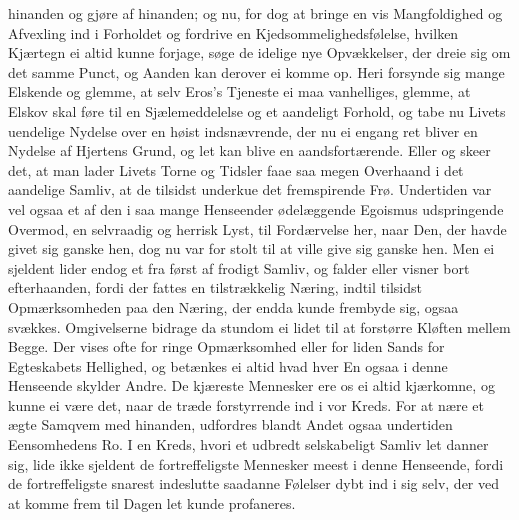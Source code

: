\documentclass[12pt,a4paper]{book}
\newcommand{\apage}[1]{\marginnote{\footnotesize\textit{[#1]}}}
\begin{document}
hinanden og gjøre af hinanden; og nu, \apage{100} for dog at bringe en vis
Mangfoldighed og Afvexling ind i Forholdet og fordrive en
Kjedsommelighedsfølelse, hvilken Kjærtegn ei altid kunne forjage, søge
de idelige nye Opvækkelser, der dreie sig om det samme Punct, og Aanden
kan derover ei komme op. Heri forsynde sig mange Elskende og glemme, at
selv Eros's Tjeneste ei maa vanhelliges, glemme, at Elskov skal føre til
en Sjælemeddelelse og et aandeligt Forhold, og tabe nu Livets uendelige
Nydelse over en høist indsnævrende, der nu ei engang ret bliver en
Nydelse af Hjertens Grund, og let kan blive en aandsfortærende. Eller og
skeer det, at man lader Livets Torne og Tidsler faae saa megen Overhaand
i det aandelige Samliv, at de tilsidst underkue det fremspirende Frø.
Undertiden var vel ogsaa et af den i saa mange Henseender ødelæggende
Egoismus udspringende Overmod, en selvraadig og herrisk Lyst, til
Fordærvelse her, naar Den, der havde givet sig ganske hen, dog nu var
for stolt til at ville give sig ganske hen. Men ei sjeldent lider endog
et fra først af frodigt Samliv, og falder eller visner bort
efterhaanden, fordi der fattes en tilstrækkelig Næring, indtil tilsidst
Opmærksomheden paa den Næring, der endda kunde frembyde sig, ogsaa
svækkes. Omgivelserne bidrage da stundom ei lidet til at forstørre
Kløften mellem Begge. Der vises ofte for ringe Opmærksomhed eller for
liden Sands for Egteskabets Hellighed, og betænkes ei altid hvad hver En
ogsaa i denne Henseende skylder Andre. De kjæreste Mennesker ere os ei
\apage{101} altid kjærkomne, og kunne ei være det, naar de træde forstyrrende ind i
vor Kreds. For at nære et ægte Samqvem med hinanden, udfordres blandt
Andet ogsaa undertiden Eensomhedens Ro. I en Kreds, hvori et udbredt
selskabeligt Samliv let danner sig, lide ikke sjeldent de
fortreffeligste Mennesker meest i denne Henseende, fordi de
fortreffeligste snarest indeslutte saadanne Følelser dybt ind i sig
selv, der ved at komme frem til Dagen let kunde profaneres.
\end{document}
